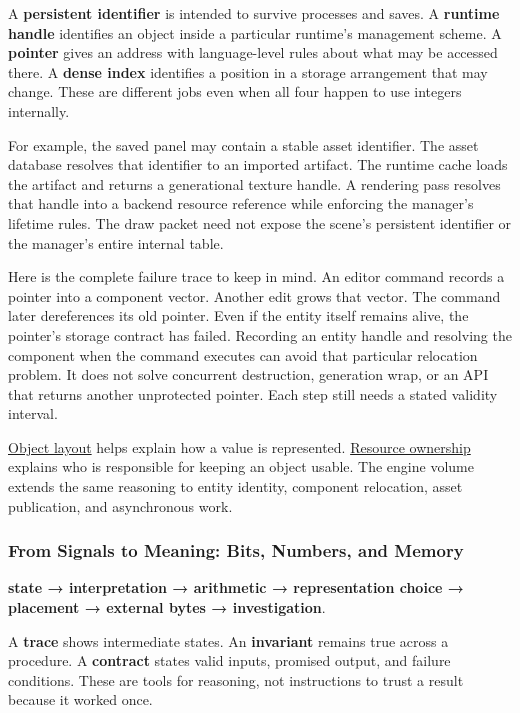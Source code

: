 A \textbf{persistent identifier} is intended to survive processes and saves. A \textbf{runtime handle} identifies an object inside a particular runtime's management scheme. A \textbf{pointer} gives an address with language-level rules about what may be accessed there. A \textbf{dense index} identifies a position in a storage arrangement that may change. These are different jobs even when all four happen to use integers internally.

For example, the saved panel may contain a stable asset identifier. The asset database resolves that identifier to an imported artifact. The runtime cache loads the artifact and returns a generational texture handle. A rendering pass resolves that handle into a backend resource reference while enforcing the manager's lifetime rules. The draw packet need not expose the scene's persistent identifier or the manager's entire internal table.

Here is the complete failure trace to keep in mind. An editor command records a pointer into a component vector. Another edit grows that vector. The command later dereferences its old pointer. Even if the entity itself remains alive, the pointer's storage contract has failed. Recording an entity handle and resolving the component when the command executes can avoid that particular relocation problem. It does not solve concurrent destruction, generation wrap, or an API that returns another unprotected pointer. Each step still needs a stated validity interval.

\hyperref[appendix-c4ac6bb0fff8]{Object layout} helps explain how a value is represented. \hyperref[appendix-69739d3ab49b]{Resource ownership} explains who is responsible for keeping an object usable. The engine volume extends the same reasoning to entity identity, component relocation, asset publication, and asynchronous work.

\subsubsection{From Signals to Meaning: Bits, Numbers, and Memory}\label{01-foundations-i-ch001-from-signals-to-meaning-bits-numbers-and-memory}

\hypertarget{01-foundations-i-ch001-from-signals-to-meaning-bits-numbers-and-memory}{}

\textbf{state → interpretation → arithmetic → representation choice → placement → external bytes → investigation}.

A \textbf{trace} shows intermediate states. An \textbf{invariant} remains true across a procedure. A \textbf{contract} states valid inputs, promised output, and failure conditions. These are tools for reasoning, not instructions to trust a result because it worked once.

